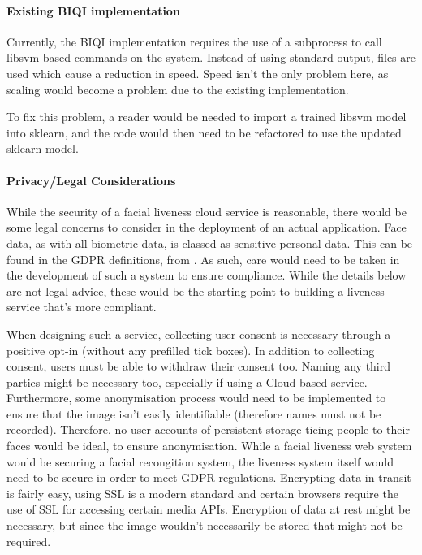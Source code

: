 \documentclass[11pt,a4paper]{article}
\begin{document}
        
        \paragraph{Existing BIQI implementation}
        Currently, the BIQI implementation requires the use of a subprocess to call libsvm based commands on the system. Instead of using standard output, files are used which
        cause a reduction in speed.
        Speed isn't the only problem here, as scaling would become a problem due to the existing implementation. 

        To fix this problem, a reader would be needed to import a trained libsvm model into sklearn, and the code would then need to be refactored to use the updated sklearn model. 

        \paragraph{Privacy/Legal Considerations}
            While the security of a facial liveness cloud service is reasonable, there would be some legal concerns to consider in the deployment of an actual application.
            Face data, as with all biometric data, is classed as sensitive personal data. This can be found in the GDPR definitions, from \cite{GDPRDefinitions}. As such, care would need to be taken in the development of such a system
            to ensure compliance. While the details below are not legal advice, these would be the starting point to building a liveness service that's more compliant.

            When designing such a service, collecting user consent is necessary through a positive opt-in (without any prefilled tick boxes). In addition to collecting consent, users must be able to withdraw their consent too.
            Naming any third parties might be necessary too, especially if using a Cloud-based service. Furthermore, some anonymisation process would need to be implemented to ensure that the image isn't easily identifiable (therefore names
            must not be recorded). Therefore, no user accounts of persistent storage tieing people to their faces would be ideal, to ensure anonymisation. While a facial liveness web system would be securing a facial recongition system, the 
            liveness system itself would need to be secure in order to meet GDPR regulations. \cite{GDPRForFacialRecognition} Encrypting data in transit is fairly easy, using SSL is a modern standard
            and certain browsers require the use of SSL for accessing certain media APIs. Encryption of data at rest might be necessary, but since the image wouldn't necessarily be stored that might not be required. 
            
\end{document}
